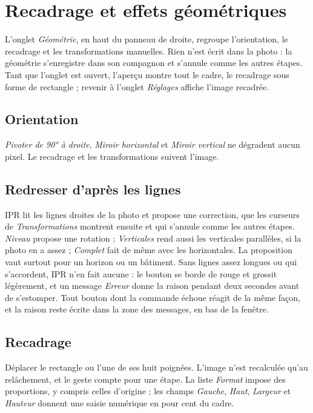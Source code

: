 \chapter{Recadrage et effets géométriques}
L’onglet \emph{Géométrie}, en haut du panneau de droite, regroupe l’orientation,
le recadrage et les transformations manuelles. Rien n’est écrit dans la photo :
la géométrie s’enregistre dans son compagnon et s’annule comme les autres étapes.
Tant que l’onglet est ouvert, l’aperçu montre tout le cadre, le recadrage sous
forme de rectangle ; revenir à l’onglet \emph{Réglages} affiche l’image recadrée.

\section{Orientation}
\emph{Pivoter de 90° à droite}, \emph{Miroir horizontal} et \emph{Miroir vertical}
ne dégradent aucun pixel. Le recadrage et les transformations suivent l’image.

\section{Redresser d’après les lignes}
IPR lit les lignes droites de la photo et propose une correction, que les curseurs
de \emph{Transformations} montrent ensuite et qui s’annule comme les autres étapes.
\emph{Niveau} propose une rotation ; \emph{Verticales} rend aussi les verticales
parallèles, si la photo en a assez ; \emph{Complet} fait de même avec les horizontales.
La proposition vaut surtout pour un horizon ou un bâtiment. Sans lignes assez longues
ou qui s’accordent, IPR n’en fait aucune : le bouton se borde de rouge et grossit
légèrement, et un message \emph{Erreur} donne la raison pendant deux secondes avant de
s’estomper. Tout bouton dont la commande échoue réagit de la même façon, et la raison
reste écrite dans la zone des messages, en bas de la fenêtre.


\section{Recadrage}
Déplacer le rectangle ou l’une de ses huit poignées. L’image n’est recalculée
qu’au relâchement, et le geste compte pour une étape. La liste \emph{Format} impose
des proportions, y compris celles d’origine ; les champs \emph{Gauche}, \emph{Haut},
\emph{Largeur} et \emph{Hauteur} donnent une saisie numérique en pour cent du cadre.

